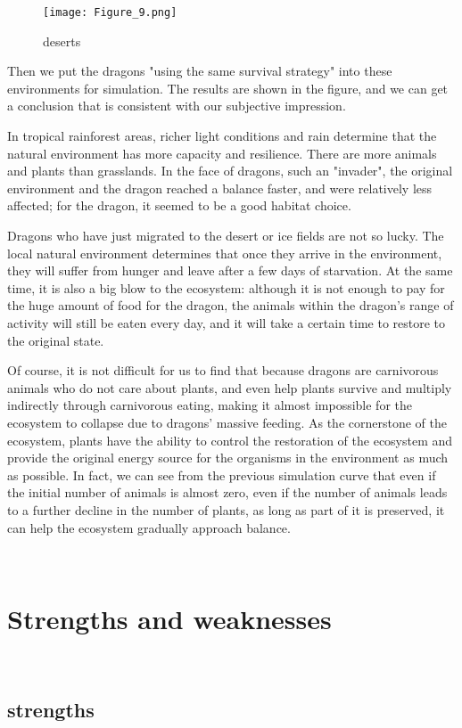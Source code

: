 \documentclass{mcmthesis}
\begin{document}
\begin{figure}[h]
    \centering
    \texttt{[image: Figure\_9.png]}
    \caption{deserts}\label{fig:simulate8}
\end{figure}

Then we put the dragons "using the same survival strategy" into these environments for simulation. The results are shown in the figure, and we can get a conclusion that is consistent with our subjective impression.

In tropical rainforest areas, richer light conditions and rain determine that the natural environment has more capacity and resilience. There are more animals and plants than grasslands. In the face of dragons, such an "invader", the original environment and the dragon reached a balance faster, and were relatively less affected; for the dragon, it seemed to be a good habitat choice.

Dragons who have just migrated to the desert or ice fields are not so lucky. The local natural environment determines that once they arrive in the environment, they will suffer from hunger and leave after a few days of starvation. At the same time, it is also a big blow to the ecosystem: although it is not enough to pay for the huge amount of food for the dragon, the animals within the dragon's range of activity will still be eaten every day, and it will take a certain time to restore to the original state.

Of course, it is not difficult for us to find that because dragons are carnivorous animals who do not care about plants, and even help plants survive and multiply indirectly through carnivorous eating, making it almost impossible for the ecosystem to collapse due to dragons’ massive feeding. As the cornerstone of the ecosystem, plants have the ability to control the restoration of the ecosystem and provide the original energy source for the organisms in the environment as much as possible. In fact, we can see from the previous simulation curve that even if the initial number of animals is almost zero, even if the number of animals leads to a further decline in the number of plants, as long as part of it is preserved, it can help the ecosystem gradually approach balance.




~\ \
\section{Strengths and weaknesses}
~\ \

\subsection{strengths}
~\ \
\end{document}
